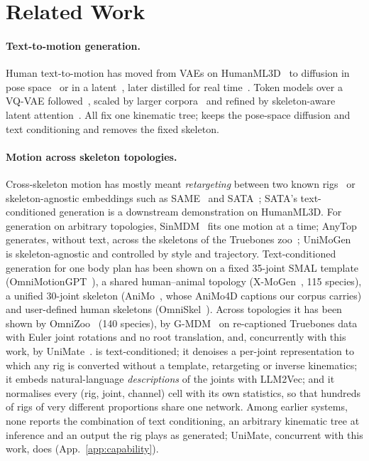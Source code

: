\section{Related Work}\label{sec:related}

\paragraph{Text-to-motion generation.} Human text-to-motion has moved from VAEs on
HumanML3D~\citep{guo2022generating} to diffusion in pose space~\citep{tevet2023mdm,zhang2024motiondiffuse}
or in a latent~\citep{chen2023mld}, later distilled for real time~\citep{dai2024motionlcm}. Token
models over a VQ-VAE followed~\citep{zhang2023t2mgpt,guo2024momask}, scaled by larger
corpora~\citep{lin2023motionx,fan2025motionmillion} and refined by skeleton-aware latent
attention~\citep{hong2025salad}. All fix one kinematic tree; \method{} keeps the pose-space
diffusion and text conditioning and removes the fixed skeleton.

\paragraph{Motion across skeleton topologies.} Cross-skeleton motion has mostly meant
\emph{retargeting} between two known rigs~\citep{villegas2018nkn,aberman2020skeleton} or
skeleton-agnostic embeddings such as SAME~\citep{lee2023same} and SATA~\citep{zhang2026sata}; SATA's
text-conditioned generation is a downstream demonstration on HumanML3D. For generation on arbitrary
topologies, SinMDM~\citep{raab2024sinmdm} fits one motion at a time; AnyTop~\citep{gat2025anytop}
generates, without text, across the skeletons of the Truebones zoo~\citep{truebones}; UniMoGen~\citep{khani2025unimogen}
is skeleton-agnostic and controlled by style and trajectory. Text-conditioned generation for one body plan
has been shown on a fixed 35-joint SMAL template (OmniMotionGPT~\citep{yang2024omnimotiongpt}), a shared
human--animal topology (X-MoGen~\citep{wang2025xmogen}, 115 species), a unified 30-joint skeleton
(AniMo~\citep{wang2025animo}, whose AniMo4D captions our corpus carries) and user-defined human skeletons
(OmniSkel~\citep{liu2025omniskel}). Across topologies it has been shown by OmniZoo~\citep{chen2025omnizoo}
(140 species), by G-MDM~\citep{lee2025dragon} on re-captioned Truebones data with Euler joint rotations and
no root translation, and, concurrently with this work, by UniMate~\citep{mou2026unimate}. \method{} is
text-conditioned; it denoises a per-joint representation to which any rig is converted without a template,
retargeting or inverse kinematics; it embeds natural-language \emph{descriptions} of the joints with LLM2Vec; and it normalises
every (rig, joint, channel) cell with its own statistics, so that
hundreds of rigs of very different proportions share one network. Among earlier systems, none reports the
combination of text conditioning, an arbitrary kinematic tree at inference and an output the rig plays as
generated; UniMate, concurrent with this work, does (App.~\ref{app:capability}).

